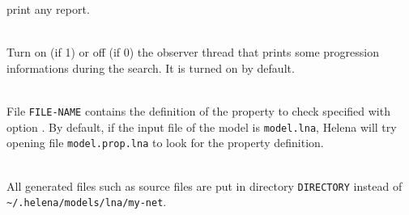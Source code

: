 \begin{description}
\begin{itemize}
    print any report.
  \end{itemize}
\item{}\\ Turn on (if 1) or
  off (if 0) the observer thread that prints some progression
  informations during the search.  It is turned on by default.
\item{}\\ File \texttt{FILE-NAME}
  contains the definition of the property to check specified with
  option .  By default, if the input file
  of the model is \texttt{model.lna}, Helena will try opening file
  \texttt{model.prop.lna} to look for the property definition.
\item{}\\ All generated files
  such as source files are put in directory \texttt{DIRECTORY} instead
  of \texttt{\~{}/.helena/models/lna/my-net}.
\end{description}

